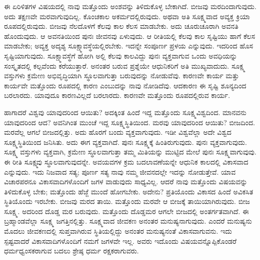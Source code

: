 ಈ ಏರಿಳಿತಗಳ ವಿಷಯದಲ್ಲಿ ನಾವು ಮತ್ತೊಂದು ಅಂಶವನ್ನು ತಿಳಿದುಕೊಳ್ಳ ಬೇಕಾಗಿದೆ. ಬೀಜವು ಮರದಿಂದಾಗುವುದು. ಅದು ತಕ್ಷಣವೇ ಮರವಾಗುವುದಿಲ್ಲ. ಕೊಂಚಕಾಲ ಅಕರ್ಮದಲ್ಲಿರುವುದು. ಅಥವಾ ಅತಿ ಸೂಕ್ಷ್ಮವಾದ ಅವ್ಯಕ್ತ ಕ್ರಿಯಾ ರೂಪದಲ್ಲಿರುವುದು. ಬೀಜವು ನೆಲದೊಳಗೆ ಕೆಲವು ಕಾಲ ಕೆಲಸ ಮಾಡಬೇಕು. ಅದು ಚೂರುಚೂರಾಗಿ ಅವನತಿ ಹೊಂದುವುದು. ಆ ಅವನತಿಯಿಂದ ಪುನಃ ಜೀವನವು ಏಳುವುದು. ಆ ರೀತಿಯಲ್ಲಿ ಕೆಲವು ಕಾಲ ಸೃಷ್ಟಿಯು ಹಾಗೆ ಕೆಲಸ ಮಾಡಬೇಕು; ಅವ್ಯಕ್ತ ಅದೃಶ್ಯ ಸೂಕ್ಷ್ಮಾವಸ್ಥೆಯಲ್ಲಿರಬೇಕು. ಇದನ್ನೇ ಸಂಪೂರ್ಣ ಪ್ರಳಯ ಎನ್ನುವುದು. ಇದರಿಂದ ಹೊಸ ಸೃಷ್ಟಿಯಾಗುವುದು. ಸೂಕ್ಷ್ಮಾವಸ್ಥೆಗೆ ಹೋಗಿ ಅಲ್ಲಿ ಕೆಲವು ಕಾಲವಿದ್ದು ಪುನಃ ವ್ಯಕ್ತವಾಗುವ ಒಂದು ಅವಧಿಯನ್ನು ಸಂಸ್ಕೃತದಲ್ಲಿ ಕಲ್ಪವೆಂದು ಕರೆಯುತ್ತಾರೆ. ಅನಂತರ ಬರುವ ಪ್ರಶ್ನೆಯೇ ಆಧುನಿಕರಿಗೆ ಅತಿ ಮುಖ್ಯವಾದುದು. ಸೂಕ್ಷ್ಮ ವಸ್ತುಗಳು ಕ್ರಮೇಣ ಅಭಿವೃದ್ಧಿಯಾಗಿ ಸ್ಥೂಲವಾಗುತ್ತಾ ಬರುವುದನ್ನು ನೋಡುವೆವು. ಕಾರಣವೇ ಕಾರ್ಯ ಮತ್ತು ಕಾರ್ಯವೇ ಮತ್ತೊಂದು ರೂಪದಲ್ಲಿ ಕಾರಣ ಎಂಬುದನ್ನು ನಾವು ನೋಡಿದೆವು. ಆದಕಾರಣ ಈ ಸೃಷ್ಟಿ ಶೂನ್ಯದಿಂದ ಬರಲಾರದು. ಯಾವುದೂ ಕಾರಣವಿಲ್ಲದೆ ಬರಲಾರದು. ಕಾರಣವೇ ಮತ್ತೊಂದು ರೂಪದಲ್ಲಿರುವ ಕಾರ್ಯ.

ಹಾಗಾದರೆ ವಿಶ್ವವು ಯಾವುದರಿಂದ ಆಯಿತು? ಅದಕ್ಕಿಂತ ಹಿಂದೆ ಇದ್ದ ಮತ್ತೊಂದು ಸೂಕ್ಷ್ಮವಿಶ್ವದಿಂದ. ಮಾನವನು ಯಾವುದರಿಂದ ಆದ? ಅವನಿಗಿಂತ ಮುಂಚೆ ಇದ್ದ ಸೂಕ್ಷ್ಮಸ್ಥಿತಿಯಿಂದ. ಮರವು ಯಾವುದರಿಂದ ಆಯಿತು? ಬೀಜದಿಂದ. ಮರವೆಲ್ಲ ಆಗಲೆ ಬೀಜದಲ್ಲಿತ್ತು. ಅದು ಹೊರಗೆ ಬಂದು ವ್ಯಕ್ತವಾಗುವುದು. ಇಡೀ ವಿಶ್ವವೆಲ್ಲಾ ಅದೇ ವಿಶ್ವದ ಸೂಕ್ಷ್ಮಸ್ಥಿತಿಯಿಂದ ಜನಿಸಿತು. ಅದು ಈಗ ವ್ಯಕ್ತವಾಗಿದೆ. ಪುನಃ ಸೂಕ್ಷ್ಮಕ್ಕೆ ಹಿಂತಿರುಗುವುದು. ಪುನಃ ವ್ಯಕ್ತವಾಗುವುದು. ಸೂಕ್ಷ್ಮ ವಸ್ತುಗಳು ವ್ಯಕ್ತವಾಗಿ, ಕ್ರಮೇಣ ಸ್ಥೂಲವಾಗುತ್ತಾ ತಮ್ಮ ಮಿತಿಯನ್ನು ಮುಟ್ಟಿದ ಮೇಲೆ ಪುನಃ ಸೂಕ್ಷ್ಮವಾಗುವುವು. ಈ ರೀತಿ ಸೂಕ್ಷ್ಮವು ಸ್ಥೂಲವಾಗುವುದನ್ನೇ. ಅವಯವಗಳ ಕ್ರಮ ಬದಲಾವಣೆಯನ್ನೇ ಆಧುನಿಕ ಕಾಲದಲ್ಲಿ ವಿಕಾಸವಾದ ಎನ್ನುವುದು. ಇದು ನಿಜವಾದ ಸತ್ಯ; ಪೂರ್ಣ ಸತ್ಯ ನಾವು ನಮ್ಮ ಜೀವನದಲ್ಲೇ ಇದನ್ನು ನೋಡುತ್ತೇವೆ. ಯಾವ ವಿಚಾರಪರನೂ ವಿಕಾಸವಾದಿಗಳೊಂದಿಗೆ ಜಗಳ ವಾಡುವುದು ಸಾಧ್ಯವಿಲ್ಲ. ಆದರೆ ನಾವು ಮತ್ತೊಂದು ವಿಷಯವನ್ನು ತಿಳಿದುಕೊಳ್ಳ ಬೇಕು; ಮತ್ತೊಂದು ಹೆಜ್ಜೆ ಮುಂದೆ ಹೋಗಬೇಕು. ಅದೇನು? ಪ್ರತಿಯೊಂದು ವಿಕಾಸದ ಹಿಂದೆ ಅವಿಕಸಿತ ಸ್ಥಿತಿಯೊಂದು ಇರಬೇಕು. ಬೀಜವು ಮರದ ತಾಯಿ. ಮತ್ತೊಂದು ಮರವೇ ಆ ಬೀಜಕ್ಕೆ ತಾಯಿಯಾಗಿರುವುದು. ಬೀಜ ಸೂಕ್ಷ್ಮ. ಅದರಿಂದ ದೊಡ್ಡ ಮರ ಬರುವುದು. ಮತ್ತೊಂದು ದೊಡ್ಡಮರ ಆಗಲೇ ಬೀಜದಲ್ಲಿ ಅಂತರ್ಗತವಾಗಿದೆ. ಈ ಬ್ರಹ್ಮಾಂಡವೆಲ್ಲಾ ಸೂಕ್ಷ್ಮ ಜಗತ್ತಿನಲ್ಲಿತ್ತು. ಸೂಕ್ಷ್ಮವಾದ ಜೀವಕಣ ಅನಂತರ ಮನುಷ್ಯನಾಗುವುದು. ಎಂದರೆ ಮನುಷ್ಯನು ಮೊದಲು ಜೀವಕಣದಲ್ಲಿ ಸುಪ್ತವಾಗಿರುವ ಸ್ಥಿತಿಯಲ್ಲಿದ್ದು ಅನಂತರ ಮನುಷ್ಯನಂತೆ ವಿಕಾಸವಾಗುವನು. ಇದು ಸ್ಪಷ್ಟವಾದರೆ ವಿಕಾಸವಾದಿಗಳೊಂದಿಗೆ ನಮಗೆ ಜಗಳವೇ ಇಲ್ಲ. ಅವರು ಇದೊಂದು ವಿಷಯವನ್ನೊಪ್ಪಿಕೊಂಡರೆ ಧರ್ಮಧ್ವಂಸಕರಾಗುವ ಬದಲು ಶ್ರೇಷ್ಠ ಧರ್ಮ ರಕ್ಷಕರಾಗುವರು.

